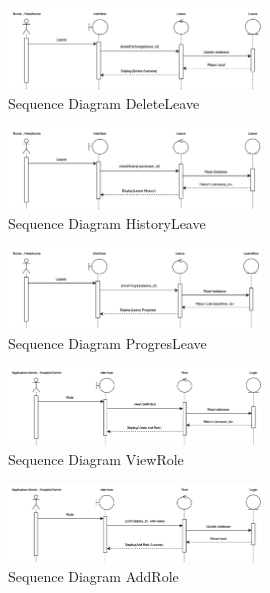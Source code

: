     \begin{figure}[h]
    \centering
    \includegraphics[width=0.6\textwidth]{Sequence 7.3.png}
    \caption{Sequence Diagram DeleteLeave}
    \end{figure}

    \begin{figure}[h]
    \centering
    \includegraphics[width=0.6\textwidth]{Sequence 7.4.png}
    \caption{Sequence Diagram HistoryLeave}
    \end{figure}


    \begin{figure}[h]
    \centering
    \includegraphics[width=0.6\textwidth]{Sequence 7.5.png}
    \caption{Sequence Diagram ProgresLeave}
    \end{figure}


\begin{figure}[h]
    \centering
    \includegraphics[width=0.6\textwidth]{Sequence 8.1.png}
    \caption{Sequence Diagram ViewRole}
    \end{figure}

    \begin{figure}[h]
    \centering
    \includegraphics[width=0.6\textwidth]{Sequence 8.2.png}
    \caption{Sequence Diagram AddRole}
    \end{figure}

